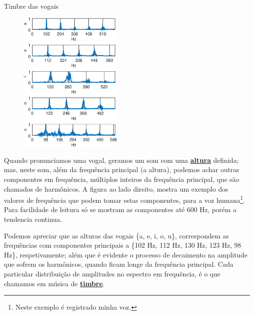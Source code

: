~\\



\begin{elaboracion}{Timbre das vogais}

\begin{figure}
\begin{center}
\includegraphics[width=0.45\textwidth]{chapters/cap-musica-basica/vocales-fourier.eps}
\end{center}
\end{figure}
Quando pronunciamos uma  vogal, geramos um som com uma \hyperref[sec:pos:Altura]{\textbf{altura}} definida;
mas, neste som, além da  frequência principal (a altura), podemos achar outras componentes em frequência,
múltiplos inteiros da  frequência principal, que são chamados de harmônicos.
A figura ao lado direito, mostra um exemplo dos valores de frequência 
que podem tomar estas componentes, para a voz humana\footnote{Neste exemplo é registrado minha voz.}.
Para facilidade de leitura só se mostram as componentes até 600 Hz, 
porém a tendencia continua. 

Podemos apreciar que as alturas  das vogais \{a, e, i, o, u\}, 
correspondem as frequências com componentes principais a \{102 Hz, 112 Hz, 130 Hz, 123 Hz, 98 Hz\}, respetivamente;
além que é evidente o processo de decaimento na amplitude que sofrem os harmônicos,
quando ficam longe da frequência principal.
Cada particular distribuição de amplitudes no espectro em frequência, 
é o que chamamos em música de \hyperref[sec:pos:timbre]{\textbf{timbre}}.


\end{elaboracion}
